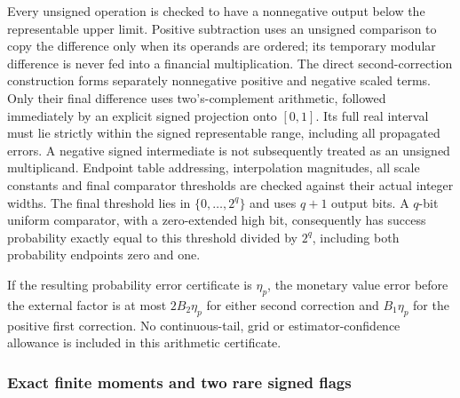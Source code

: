 Every unsigned operation is checked to have a nonnegative output below the
representable upper limit.  Positive subtraction uses an unsigned comparison
to copy the difference only when its operands are ordered; its temporary
modular difference is never fed into a financial multiplication.  The direct
second-correction construction forms separately nonnegative positive and
negative scaled terms.  Only their final difference uses two's-complement
arithmetic, followed immediately by an explicit signed projection onto
$[0,1]$.  Its full real interval must lie strictly within the signed
representable range, including all propagated errors.  A negative signed
intermediate is not subsequently treated as an unsigned multiplicand.
Endpoint table addressing, interpolation magnitudes, all scale constants and
final comparator thresholds are checked against their actual integer widths.
The final threshold lies in $\{0,\ldots,2^q\}$ and uses $q+1$ output bits.
A $q$-bit uniform comparator, with a zero-extended high bit, consequently has
success probability exactly equal to this threshold divided by $2^q$,
including both probability endpoints zero and one.

If the resulting probability error certificate is $\eta_p$, the monetary
value error before the external factor is at most $2B_2\eta_p$ for either
second correction and $B_1\eta_p$ for the positive first correction.
No continuous-tail, grid or estimator-confidence allowance is included in
this arithmetic certificate.

\subsubsection{Exact finite moments and two rare signed flags}


